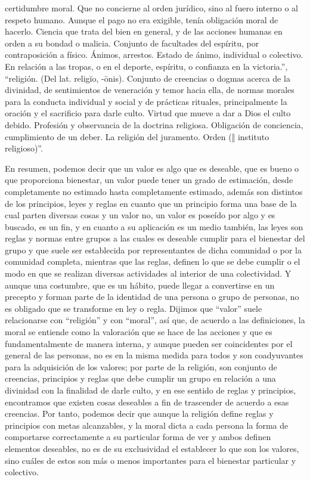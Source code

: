 certidumbre moral. Que no concierne al orden jurídico, sino al fuero interno o al respeto humano. Aunque el pago no era exigible, tenía obligación moral de hacerlo. Ciencia que trata del bien en general, y de las acciones humanas en orden a su bondad o malicia. Conjunto de facultades del espíritu, por contraposición a físico. Ánimos, arrestos. Estado de ánimo, individual o colectivo. En relación a las tropas, o en el deporte, espíritu, o confianza en la victoria.”, “religión. (Del lat. religĭo, -ōnis). Conjunto de creencias o dogmas acerca de la divinidad, de sentimientos de veneración y temor hacia ella, de normas morales para la conducta individual y social y de prácticas rituales, principalmente la oración y el sacrificio para darle culto. Virtud que mueve a dar a Dios el culto debido. Profesión y observancia de la doctrina religiosa. Obligación de conciencia, cumplimiento de un deber. La religión del juramento. Orden (‖ instituto religioso)”.

En resumen, podemos decir que un valor es algo que es deseable, que es bueno o que proporciona bienestar, un valor puede tener un grado de estimación, desde completamente no estimado hasta completamente estimado, además son distintos de los principios, leyes y reglas en cuanto que un principio forma una base de la cual parten diversas cosas y un valor no, un valor es poseído por algo y es buscado, es un fin, y en cuanto a su aplicación es un medio también, las leyes son reglas y normas entre grupos a las cuales es deseable cumplir para el bienestar del grupo y que suele ser establecida por representantes de dicha comunidad o por la comunidad completa, mientras que las reglas, definen lo que se debe cumplir o el modo en que se realizan diversas actividades al interior de una colectividad. Y aunque una costumbre, que es un hábito, puede llegar a convertirse en un precepto y forman parte de la identidad de una persona o grupo de personas, no es obligado que se transforme en ley o regla. Dijimos que “valor” suele relacionarse con “religión” y con “moral”, así que, de acuerdo a las definiciones, la moral se entiende como la valoración que se hace de las acciones y que es fundamentalmente de manera interna, y aunque pueden ser coincidentes por el general de las personas, no es en la misma medida para todos y son coadyuvantes para la adquisición de los valores; por parte de la religión, son conjunto de creencias, principios y reglas que debe cumplir un grupo en relación a una divinidad con la finalidad de darle culto, y en ese sentido de reglas y principios, encontramos que existen cosas deseables a fin de trascender de acuerdo a esas creencias. Por tanto, podemos decir que aunque la religión define reglas y principios con metas alcanzables, y la moral dicta a cada persona la forma de comportarse correctamente a su particular forma de ver y ambos definen elementos deseables, no es de su exclusividad el establecer lo que son los valores, sino cuáles de estos son más o menos importantes para el bienestar particular y colectivo.

